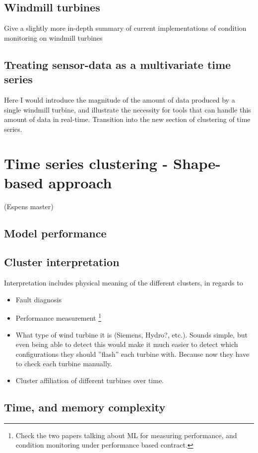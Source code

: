 \documentclass[12pt,english,a4paper,openright]{article}
\begin{document}
\subsection{Windmill turbines}
Give a slightly more in-depth summary of current implementations of condition monitoring on windmill turbines 

\subsection{Treating sensor-data as a multivariate time series}
Here I would introduce the magnitude of the amount of data produced by a single windmill turbine, and illustrate the necessity for tools that can handle this amount of data in real-time. Transition into the new section of clustering of time series.

\section{Time series clustering - Shape-based approach}
(Espens master)

\subsection{Model performance}

\subsection{Cluster interpretation}
Interpretation includes physical meaning of the different clusters, in regards to 

\begin{itemize}
    \item Fault diagnosis
    \item Performance measurement \footnote{Check the two papers talking about ML for measuring performance, and condition monitoring under performance based contract.}
    \item What type of wind turbine it is (Siemens, Hydro?, etc.). Sounds simple, but even being able to detect this would make it much easier to detect which configurations they should ''flash'' each turbine with. Because now they have to check each turbine manually.
    \item Cluster affiliation of different turbines over time. 
\end{itemize}

\subsection{Time, and memory complexity}
\end{document}
